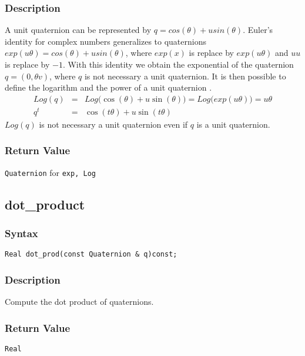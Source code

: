 \documentclass[dvips,11pt,fleqn]{report}
\begin{document}
\subsubsection{Description}
A unit quaternion can be represented by $q = cos(\theta) + u
sin(\theta)$. Euler's identity for complex numbers generalizes to
quaternions $exp(u\theta) = cos(\theta) + u sin(\theta)$, where
$exp(x)$ is replace by $exp(u\theta)$ and $uu$ is replace by $-1$.
With this identity we obtain the exponential of the quaternion $q =
(0,\theta v)$, where $q$ is not necessary a unit quaternion. It is
then possible to define the logarithm and the power of a unit
quaternion \cite{Dam98}.
\begin{eqnarray}
 Log(q) &=& Log\big(\cos(\theta) + u \sin(\theta)\big) =
 Log\big(exp(u\theta)\big) = u\theta \\
 q^t &=& \cos(t\theta) + u \sin(t\theta) 
\end{eqnarray}
$Log(q)$ is not necessary a unit quaternion even if $q$ is a unit
quaternion.

\subsubsection*{Return Value}

{\tt Quaternion} for \texttt{exp, Log}

\newpage

\subsection*{dot\_product}

\subsubsection*{Syntax}
\begin{verbatim}
Real dot_prod(const Quaternion & q)const;
\end{verbatim}
\subsubsection{Description}
Compute the dot product of quaternions.

\subsubsection*{Return Value}

{\tt Real}

\newpage
\end{document}
